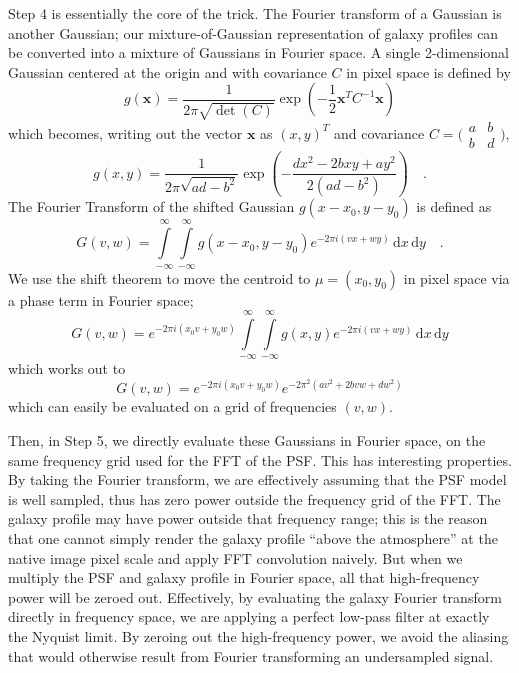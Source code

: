 \documentclass[11pt,preprint]{aastex}
\begin{document}
Step 4 is essentially the core of the trick.  The Fourier transform of
a Gaussian is another Gaussian; our mixture-of-Gaussian representation
of galaxy profiles can be converted into a mixture of Gaussians in
Fourier space.
%
A single 2-dimensional Gaussian
centered at the origin and
with covariance $C$
in pixel space is defined by
\[ g(\bm{x}) = \frac{1}{2 \pi \sqrt{\det(C)}} 
\exp\left( -\frac{1}{2} \bm{x}^T C^{-1} \bm{x} \right)
\]
which becomes, writing out the vector $\bm{x}$ as $(x,y)^T$
and covariance $C = \bigl(\begin{smallmatrix}
a&b \\ b&d
\end{smallmatrix} \bigr)$,
\[ g(x, y) = \frac{1}{2 \pi \sqrt{a d - b^2}}
\exp \left(
-\frac{d x^2 - 2 b x y + a y^2}{2(a d - b^2)}
\right) \quad .
\]
%
The Fourier Transform of the shifted Gaussian $g(x - x_0, y - y_0)$ is defined as
\[
G(v,w) = 
\int\limits_{-\infty}^{\infty}
\int\limits_{-\infty}^{\infty}
g(x - x_0, y - y_0) e^{-2 \pi i (v x + w y)} \, \mathrm{d}x \, \mathrm{d}y
\quad .
\] 
We use the shift theorem to move the centroid to $\mu = (x_0, y_0)$
in pixel space via a phase term in Fourier space;
\[
G(v, w) =
e^{-2 \pi i (x_0 v + y_0 w)}
\int\limits_{-\infty}^{\infty}
\int\limits_{-\infty}^{\infty}
g(x, y) e^{-2 \pi i (v x + w y)} \, \mathrm{d}x \, \mathrm{d}y
\] 
%
which works out to
\[ G(v,w) = 
e^{-2 \pi i (x_0 v + y_0 w)}
e^{-2 \pi^2 (a v^2 + 2 b v w + d w^2)}
\]
which can easily be evaluated on a grid of frequencies $(v, w)$.




Then, in Step 5, we directly evaluate these Gaussians in Fourier
space, on the same frequency grid used for the FFT of the PSF.  This
has interesting properties.  By taking the Fourier transform, we are
effectively assuming that the PSF model is well sampled, thus has zero
power outside the frequency grid of the FFT.  The galaxy profile may
have power outside that frequency range; this is the reason that one
cannot simply render the galaxy profile ``above the atmosphere'' at
the native image pixel scale and apply FFT convolution naively.  But
when we multiply the PSF and galaxy profile in Fourier space, all that
high-frequency power will be zeroed out.  Effectively, by evaluating
the galaxy Fourier transform directly in frequency space, we are
applying a perfect low-pass filter at exactly the Nyquist limit.  By
zeroing out the high-frequency power, we avoid the aliasing that would
otherwise result from Fourier transforming an undersampled signal.
%
\end{document}
